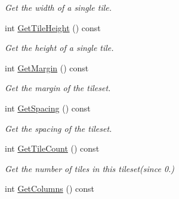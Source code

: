 \begin{DoxyCompactItemize}
\begin{DoxyCompactList}\small\item\em Get the width of a single tile. \end{DoxyCompactList}\item 
\hypertarget{classTmx_1_1Tileset_ac595902c48970db50e50c0254804a363}{int \hyperlink{classTmx_1_1Tileset_ac595902c48970db50e50c0254804a363}{Get\-Tile\-Height} () const }\label{classTmx_1_1Tileset_ac595902c48970db50e50c0254804a363}

\begin{DoxyCompactList}\small\item\em Get the height of a single tile. \end{DoxyCompactList}\item 
\hypertarget{classTmx_1_1Tileset_aa0d023ff755dbe75220c72d1a2d14783}{int \hyperlink{classTmx_1_1Tileset_aa0d023ff755dbe75220c72d1a2d14783}{Get\-Margin} () const }\label{classTmx_1_1Tileset_aa0d023ff755dbe75220c72d1a2d14783}

\begin{DoxyCompactList}\small\item\em Get the margin of the tileset. \end{DoxyCompactList}\item 
\hypertarget{classTmx_1_1Tileset_ad6473b218bae6f49d04f895bc5a83d7c}{int \hyperlink{classTmx_1_1Tileset_ad6473b218bae6f49d04f895bc5a83d7c}{Get\-Spacing} () const }\label{classTmx_1_1Tileset_ad6473b218bae6f49d04f895bc5a83d7c}

\begin{DoxyCompactList}\small\item\em Get the spacing of the tileset. \end{DoxyCompactList}\item 
\hypertarget{classTmx_1_1Tileset_ab6ccaf5f4147e9b95c16e69163036df8}{int \hyperlink{classTmx_1_1Tileset_ab6ccaf5f4147e9b95c16e69163036df8}{Get\-Tile\-Count} () const }\label{classTmx_1_1Tileset_ab6ccaf5f4147e9b95c16e69163036df8}

\begin{DoxyCompactList}\small\item\em Get the number of tiles in this tileset(since 0.) \end{DoxyCompactList}\item 
\hypertarget{classTmx_1_1Tileset_a1cb9e6e4e9ea487d02558c5768c8f41a}{int \hyperlink{classTmx_1_1Tileset_a1cb9e6e4e9ea487d02558c5768c8f41a}{Get\-Columns} () const }\label{classTmx_1_1Tileset_a1cb9e6e4e9ea487d02558c5768c8f41a}


\end{DoxyCompactItemize}
